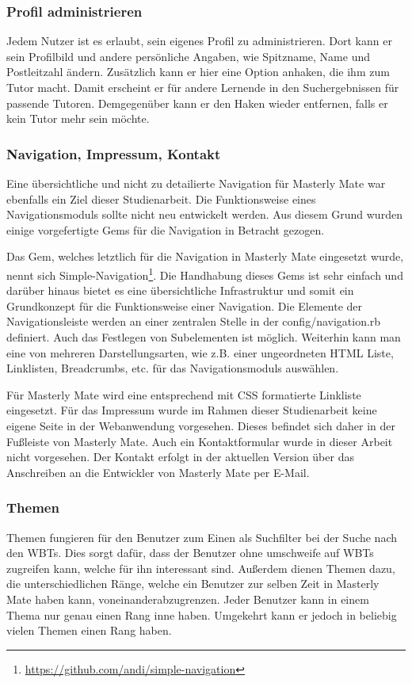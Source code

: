 \subsubsection{Profil administrieren}
Jedem Nutzer ist es erlaubt, sein eigenes Profil zu administrieren. Dort kann er
sein Profilbild und andere persönliche Angaben, wie Spitzname, Name und
Postleitzahl ändern. Zusätzlich kann er hier eine Option anhaken, die ihm zum
Tutor macht. Damit erscheint er für andere Lernende in den Suchergebnissen für
passende Tutoren. Demgegenüber kann er den Haken wieder entfernen, falls er kein
Tutor mehr sein möchte.

\subsubsection{Navigation, Impressum, Kontakt}
Eine übersichtliche und nicht zu detailierte Navigation für Masterly Mate war
ebenfalls ein Ziel dieser Studienarbeit. Die Funktionsweise eines
Navigationsmoduls sollte nicht neu entwickelt werden. Aus diesem Grund wurden
einige vorgefertigte Gems für die Navigation in Betracht gezogen. 

Das Gem, welches letztlich für die Navigation in Masterly Mate eingesetzt wurde,
nennt sich Simple-Navigation\footnote{\url{https://github.com/andi/simple-navigation}}.
Die Handhabung dieses Gems ist sehr einfach und darüber hinaus bietet es eine
übersichtliche Infrastruktur und somit ein Grundkonzept für die Funktionsweise
einer Navigation. Die Elemente der Navigationsleiste werden an einer zentralen
Stelle in der config/navigation.rb definiert. Auch das Festlegen von
Subelementen ist möglich. Weiterhin kann man eine von mehreren 
Darstellungsarten, wie z.B. einer ungeordneten HTML Liste, Linklisten,
Breadcrumbs, etc. für das Navigationsmoduls auswählen. 

Für Masterly Mate wird eine entsprechend mit CSS formatierte Linkliste
eingesetzt. Für das Impressum wurde im Rahmen dieser Studienarbeit keine eigene
Seite in der Webanwendung vorgesehen. Dieses befindet sich daher in der Fußleiste von
Masterly Mate. Auch ein Kontaktformular wurde in dieser Arbeit nicht vorgesehen.
Der Kontakt erfolgt in der aktuellen Version über das Anschreiben an die
Entwickler von Masterly Mate per E-Mail. 

\subsubsection{Themen}
Themen fungieren für den Benutzer zum Einen als Suchfilter bei der Suche nach
den WBTs. Dies sorgt dafür, dass der Benutzer ohne umschweife auf WBTs zugreifen
kann, welche für ihn interessant sind. Außerdem dienen Themen dazu, die
unterschiedlichen Ränge, welche ein Benutzer zur selben Zeit in Masterly Mate
haben kann, voneinanderabzugrenzen. Jeder Benutzer kann in einem Thema nur genau
einen Rang inne haben. Umgekehrt kann er jedoch in beliebig vielen Themen einen
Rang haben.

